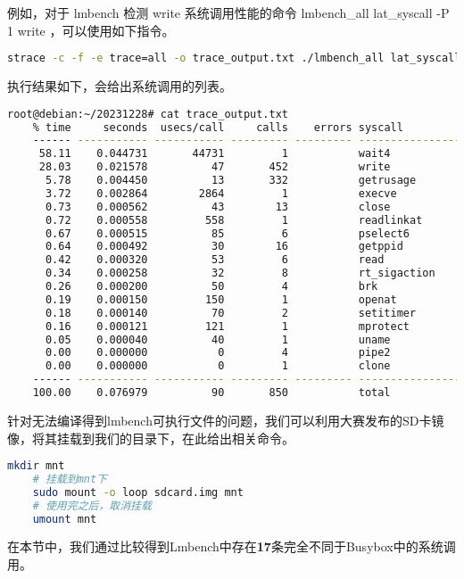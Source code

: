 例如，对于 lmbench 检测 write 系统调用性能的命令 lmbench_all lat_syscall -P 1 write ，可以使用如下指令。

\begin{lstlisting}[language=bash]
      strace -c -f -e trace=all -o trace_output.txt ./lmbench_all lat_syscall -P 1 write
\end{lstlisting}

执行结果如下，会给出系统调用的列表。
\begin{lstlisting}[language=bash]
	root@debian:~/20231228# cat trace_output.txt
	% time     seconds  usecs/call     calls    errors syscall
	------ ----------- ----------- --------- --------- ----------------
	 58.11    0.044731       44731         1           wait4
	 28.03    0.021578          47       452           write
	  5.78    0.004450          13       332           getrusage
	  3.72    0.002864        2864         1           execve
	  0.73    0.000562          43        13           close
	  0.72    0.000558         558         1           readlinkat
	  0.67    0.000515          85         6           pselect6
	  0.64    0.000492          30        16           getppid
	  0.42    0.000320          53         6           read
	  0.34    0.000258          32         8           rt_sigaction
	  0.26    0.000200          50         4           brk
	  0.19    0.000150         150         1           openat
	  0.18    0.000140          70         2           setitimer
	  0.16    0.000121         121         1           mprotect
	  0.05    0.000040          40         1           uname
	  0.00    0.000000           0         4           pipe2
	  0.00    0.000000           0         1           clone
	------ ----------- ----------- --------- --------- ----------------
	100.00    0.076979          90       850           total
\end{lstlisting}

针对无法编译得到lmbench可执行文件的问题，我们可以利用大赛发布的SD卡镜像，将其挂载到我们的目录下，在此给出相关命令。

\begin{lstlisting}[language=bash]
     	mkdir mnt
	# 挂载到mnt下
	sudo mount -o loop sdcard.img mnt
	# 使用完之后，取消挂载
	umount mnt
\end{lstlisting}


在本节中，我们通过比较得到Lmbench中存在\textbf{17}条完全不同于Busybox中的系统调用。

